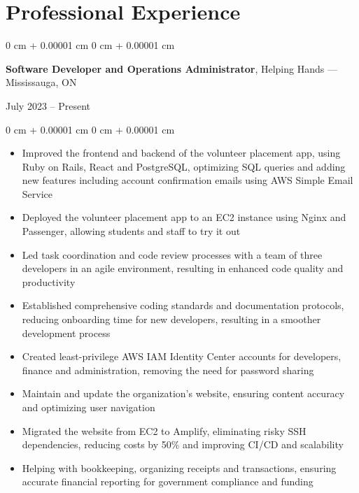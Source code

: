 \documentclass[10pt, letterpaper]{article}
\newenvironment{highlights}{
    \begin{itemize}[
        topsep=0.10 cm,
        parsep=0.10 cm,
        partopsep=0pt,
        itemsep=0pt,
        leftmargin=0 cm + 10pt
    ]
}{
    \end{itemize}
} %
\newenvironment{onecolentry}{
    \begin{adjustwidth}{
        0 cm + 0.00001 cm
    }{
        0 cm + 0.00001 cm
    }
}{
    \end{adjustwidth}
} %
\newenvironment{twocolentry}[2][]{
    \onecolentry
    \def\secondColumn{#2}
    \setcolumnwidth{\fill, 4 cm}
    \begin{paracol}{2}
}{
    \switchcolumn \raggedleft \secondColumn
    \end{paracol}
    \endonecolentry
} %
\begin{document}
    \section{Professional Experience}
        \begin{twocolentry}{July 2023 -- Present}
            \textbf{Software Developer and Operations Administrator}, Helping Hands --- Mississauga, ON
        \end{twocolentry}
        \vspace{0.10 cm}
        \begin{onecolentry}
            \begin{highlights}
                \item Improved the frontend and backend of the volunteer placement app, using Ruby on Rails, React and PostgreSQL, optimizing SQL queries and adding new features including account confirmation emails using AWS Simple Email Service
                \item Deployed the volunteer placement app to an EC2 instance using Nginx and Passenger, allowing students and staff to try it out
                \item Led task coordination and code review processes with a team of three developers in an agile environment, resulting in enhanced code quality and productivity
                \item Established comprehensive coding standards and documentation protocols, reducing onboarding time for new developers, resulting in a smoother development process
                \item Created least-privilege AWS IAM Identity Center accounts for developers, finance and administration, removing the need for password sharing
                \item Maintain and update the organization's website, ensuring content accuracy and optimizing user navigation
                \item Migrated the website from EC2 to Amplify, eliminating risky SSH dependencies, reducing costs by 50\% and improving CI/CD and scalability
                \item Helping with bookkeeping, organizing receipts and transactions, ensuring accurate financial reporting for government compliance and funding
            \end{highlights}
        \end{onecolentry}
        \vspace{0.5 cm}
\end{document}
